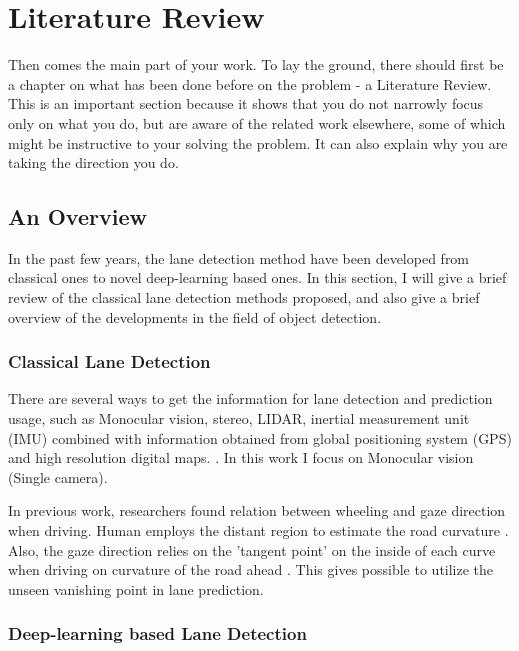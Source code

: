 
\chapter{Literature Review}
\label{cha:literature}
\begin{spacing}{1.5}
\setlength{\parskip}{0.3in}

Then comes the main part of your work. To lay the ground, there should first be a chapter on what has been done before on the problem - a Literature Review. This is an important section because it shows that you do not narrowly focus only on what you do, but are aware of the
related work elsewhere, some of which might be instructive to your solving the problem. It can also explain why you are taking the direction you do.

\section{An Overview}
\label{sec:LR_overview}

In the past few years, the lane detection method have been developed from classical ones to novel deep-learning based ones. In this section, I will give a brief review of the classical lane detection methods proposed, and also give a brief overview of the developments in the field of object detection.

\subsection{Classical Lane Detection}

There are several ways to get the information for lane detection and prediction usage, such as Monocular vision, stereo, LIDAR, inertial measurement unit (IMU) combined with information obtained from global positioning system (GPS) and high resolution digital maps. \cite{hillel2014recent}. In this work I focus on Monocular vision (Single camera).

In previous work, researchers found relation between wheeling and gaze direction when driving. Human employs the distant region to estimate the road curvature \cite{land1995parts}. Also, the gaze direction relies on the 'tangent point' on the inside of each curve when driving on curvature of the road ahead \cite{land1994we}. This gives possible to utilize the unseen vanishing point in lane prediction.

\subsection{Deep-learning based Lane Detection}


\end{spacing}
